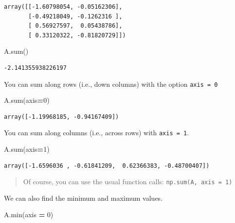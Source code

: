 \documentclass[
  letterpaper,
]{scrbook}
\newenvironment{Shaded}{\begin{snugshade}}{\end{snugshade}}
\newcommand{\BuiltInTok}[1]{#1}
\newcommand{\DecValTok}[1]{\textcolor[rgb]{0.00,0.00,0.81}{#1}}
\newcommand{\NormalTok}[1]{#1}
\newcommand{\OperatorTok}[1]{\textcolor[rgb]{0.81,0.36,0.00}{\textbf{#1}}}
\begin{document}
\begin{verbatim}
array([[-1.60798054, -0.05162306],
       [-0.49218049, -0.1262316 ],
       [ 0.56927597,  0.05438786],
       [ 0.33120322, -0.81820729]])
\end{verbatim}

\begin{Shaded}
\begin{Highlighting}[]
\NormalTok{A.}\BuiltInTok{sum}\NormalTok{()}
\end{Highlighting}
\end{Shaded}

\begin{verbatim}
-2.141355938226197
\end{verbatim}

You can sum along rows (i.e., down columns) with the option \texttt{axis\ =\ 0}

\begin{Shaded}
\begin{Highlighting}[]
\NormalTok{A.}\BuiltInTok{sum}\NormalTok{(axis}\OperatorTok{=}\DecValTok{0}\NormalTok{)}
\end{Highlighting}
\end{Shaded}

\begin{verbatim}
array([-1.19968185, -0.94167409])
\end{verbatim}

You can sum along columns (i.e., across rows) with \texttt{axis\ =\ 1}.

\begin{Shaded}
\begin{Highlighting}[]
\NormalTok{A.}\BuiltInTok{sum}\NormalTok{(axis}\OperatorTok{=}\DecValTok{1}\NormalTok{)}
\end{Highlighting}
\end{Shaded}

\begin{verbatim}
array([-1.6596036 , -0.61841209,  0.62366383, -0.48700407])
\end{verbatim}

\begin{quote}
Of course, you can use the usual function calls: \texttt{np.sum(A,\ axis\ =\ 1)}
\end{quote}

We can also find the minimum and maximum values.

\begin{Shaded}
\begin{Highlighting}[]
\NormalTok{A.}\BuiltInTok{min}\NormalTok{(axis }\OperatorTok{=} \DecValTok{0}\NormalTok{)}
\end{Highlighting}
\end{Shaded}
\end{document}

